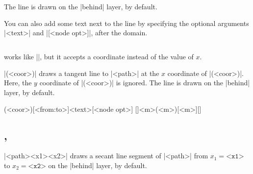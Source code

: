 The line is drawn on the |behind| layer, by default.

You can also add some text next to the line by specifying the optional arguments |{<text>}| and |[<node opt>]|, after the domain.

\begin{tzcode}{.3}
\end{tzcode}

\subsection{\protect\cmd{\tztangent}}
\label{ssi:tztangent}

\icmd{\tztangent} works like |\tztangentat|, but it accepts a coordinate instead of the value of $x$.

|(<coor>)| draws a tangent line to |<path>| at the $x$ coordinate of |(<coor>)|. Here, the $y$ coordinate of |(<coor>)| is ignored. The line is drawn on the |behind| layer, by default.


\begin{tzdef}{}
(<coor>)[<from:to>]{<text>}[<node opt>]
  []{<m>}(<m>)[<m>]{}[]
\end{tzdef}

\begin{tzcode}{.3}
\end{tzcode}



\subsection{\protect\cmd{\tzsecantat}, \protect\cmd{\tzsecant}}
\label{ssi:tzsecant}

\icmd{\tzsecantat}|{<path>}{<x1>}{<x2>}| draws a secant line segment of |<path>| from $x_1=\texttt{<x1>}$ to $x_2=\texttt{<x2>}$ on the |behind| layer, by default.

